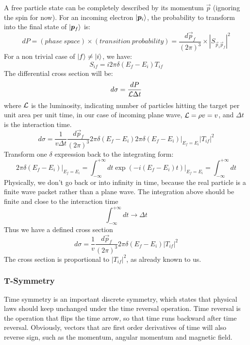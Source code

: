 A free particle state can be completely described by its momentum $\vec{p}$
(ignoring the spin for now). For an incoming electron $\ket{\boldsymbol{p}_i}$, the probability
to transform into the final state of $\ket{\boldsymbol{p}_f}$ is:
\begin{equation}
    dP = (phase\ space) \times (transition\ probability) = \frac{d\vec{p}_f}{(2\pi)^3} \times |S_{\vec{p}_i\vec{p}_f}|^2
\end{equation}
For a non trivial case of $\ket{f} \ne \ket{i}$, we have:
\begin{equation}
    S_{if} = i2\pi \delta(E_f - E_i)T_{if}
\end{equation}
The differential cross section will be:
\begin{equation}
    d\sigma = \frac{dP}{\mathcal{L} \Delta t}
\end{equation}
where $\mathcal{L}$ is the luminosity, indicating number of particles hitting 
the target per unit area per unit time, in our case of incoming plane wave, 
$\mathcal{L} = \rho v = v$, and $\Delta t$ is the interaction time.
\begin{equation}
    d\sigma = \frac{1}{v\Delta t} \frac{d\vec{p}_f}{(2\pi)^3} 2\pi\delta(E_f - E_i) \left. 2\pi\delta(E_f - E_i)\right|_{E_f = E_i} |T_{if}|^2
\end{equation}
Transform one $\delta$ expression back to the integrating form: 
\begin{equation}
    \left. 2\pi\delta(E_f - E_i) \right|_{E_f = E_i} 
    = \int_{-\infty}^{+\infty} dt \left.\exp(-i(E_f - E_i)t)\right|_{E_f = E_i}
    = \int_{-\infty}^{+\infty} dt 
\end{equation}
Physically, we don't go back or into infinity in time, because the real particle
is a finite wave packet rather than a plane wave. The integration above should 
be finite and close to the interaction time
\begin{equation}
    \int_{-\infty}^{+\infty} dt \rightarrow \Delta t
\end{equation}
Thus we have a defined cross section
\begin{equation}
    d\sigma = \frac{1}{v} \frac{d\vec{p}_f}{(2\pi)^3} 2\pi\delta(E_f - E_i) |T_{if}|^2
\end{equation}
The cross section is proportional to $|T_{if}|^2$, as already known to us.


\subsubsection{T-Symmetry}
Time symmetry is an important discrete symmetry, which states that physical laws should
keep unchanged under the time reversal operation. Time reversal is the operation
that flips the time arrow, so that time runs backward after time reversal. Obviously, 
vectors that are first order derivatives of time will also reverse sign, such
as the momentum, angular momentum and magnetic field.

